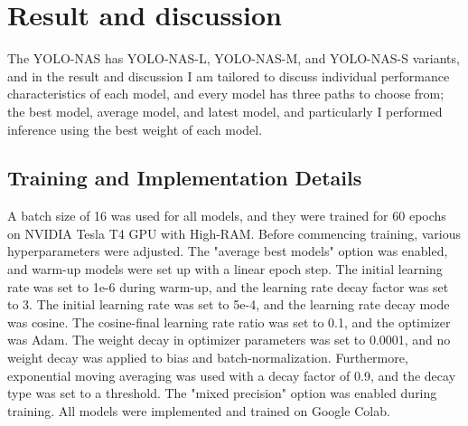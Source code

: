 \section{Result and discussion}
The YOLO-NAS has YOLO-NAS-L, YOLO-NAS-M, and YOLO-NAS-S variants, and in the result and discussion I am tailored to discuss individual performance characteristics of each model, and every model has three paths to choose from; the best model, average model, and latest model, and particularly I performed inference using the best weight of each model.

\subsection{Training and Implementation Details}
A batch size of 16 was used for all models, and they were trained for 60 epochs on NVIDIA Tesla T4 GPU with High-RAM. Before commencing training, various hyperparameters were adjusted. The "average best models" option was enabled, and warm-up models were set up with a linear epoch step. The initial learning rate was set to 1e-6 during warm-up, and the learning rate decay factor was set to 3. The initial learning rate was set to 5e-4, and the learning rate decay mode was cosine. The cosine-final learning rate ratio was set to 0.1, and the optimizer was Adam. The weight decay in optimizer parameters was set to 0.0001, and no weight decay was applied to bias and batch-normalization.
Furthermore, exponential moving averaging was used with a decay factor of 0.9, and the decay type was set to a threshold. The "mixed precision" option was enabled during training. All models were implemented and trained on Google Colab.
